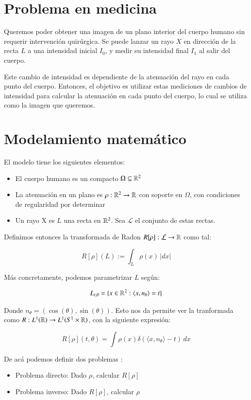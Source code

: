 \section{Problema en medicina}
Queremos poder obtener una imagen de un plano interior del cuerpo humano sin requerir intervención quirúrgica. Se puede lanzar un rayo $X$ en dirección de la recta $L$ a una intensidad inicial $I_0$, y medir su intensidad final $I_1$ al salir del cuerpo. 

Este cambio de intensidad es dependiente de la atenuación del rayo en cada punto del cuerpo. Entonces, el objetivo es utilizar estas mediciones de cambios de intensidad para calcular la atenuación en cada punto del cuerpo, lo cual se utiliza como la imagen que queremos.

\section{Modelamiento matemático}

El modelo tiene los siguientes elementos:
\begin{itemize}
    \item El cuerpo humano es un compacto $\Omega\subseteq \mathbb{R}^2$
    \item La atenuación en un plano es $\rho:\mathbb{R}^2\to\mathbb{R}$ con soporte en $\Omega$, con condiciones de regularidad por determinar
    \item Un rayo X es $L$ una recta en $\mathbb{R}^2$. Sea $\mathcal{L}$ el conjunto de estas rectas.
\end{itemize}

Definimos entonces la transformada de Radon $R[\rho]:\mathcal{L}\to\mathbb{R}$ como tal:

\[
R[\rho](L) := \int_L \rho(x)\,|dx|
\]

Más concretamente, podemos parametrizar $L$ según:

\[
L_{t, \theta} = \{x\in\mathbb{R}^2: \langle x, n_\theta\rangle = t\}
\]

Donde $n_\theta = (\cos(\theta), \sin(\theta))$. Esto nos da permite ver la tranformada como $R: L^1(\mathbb{R})\to L^1(S^1\times \mathbb{R})$, con la siguiente expresión:


\[
R[\rho](t, \theta) = \int \rho(x)\delta(\langle x, n_\theta\rangle - t)\, dx
\]


De acá podemos definir dos problemas \citep{kirsch_2022}:
\begin{itemize}
    \item Problema directo: Dado $\rho$, calcular $R[\rho]$
    \item Problema inverso: Dado $R[\rho]$, calcular $\rho$
\end{itemize}

